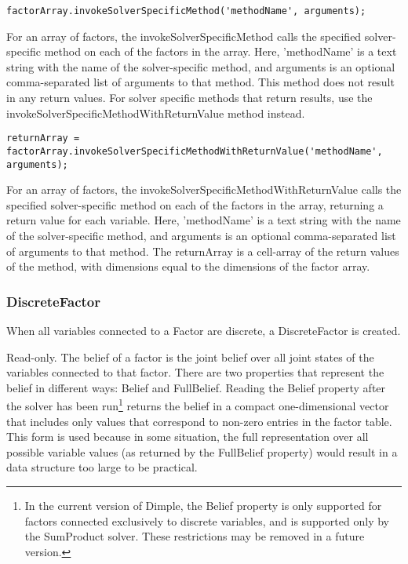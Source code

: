 
\begin{lstlisting}
factorArray.invokeSolverSpecificMethod('methodName', arguments);
\end{lstlisting}

For an array of factors, the invokeSolverSpecificMethod calls the specified solver-specific method on each of the factors in the array.  Here, 'methodName' is a text string with the name of the solver-specific method, and arguments is an optional comma-separated list of arguments to that method.  This method does not result in any return values.  For solver specific methods that return results, use the invokeSolverSpecificMethodWithReturnValue method instead.



\begin{lstlisting}
returnArray = factorArray.invokeSolverSpecificMethodWithReturnValue('methodName', arguments);
\end{lstlisting}

For an array of factors, the invokeSolverSpecificMethodWithReturnValue calls the specified solver-specific method on each of the factors in the array, returning a return value for each variable.  Here, 'methodName' is a text string with the name of the solver-specific method, and arguments is an optional comma-separated list of arguments to that method.  The returnArray is a cell-array of the return values of the method, with dimensions equal to the dimensions of the factor array.

\fi

\subsubsection{DiscreteFactor}

When all variables connected to a Factor are discrete, a DiscreteFactor is created.


\label{sec:Factor.Belief}

Read-only.  The belief of a factor is the joint belief over all joint states of the variables connected to that factor.  There are two properties that represent the belief in different ways: Belief and FullBelief.  Reading the Belief property after the solver has been run\footnote{In the current version of Dimple, the Belief property is only supported for factors connected exclusively to discrete variables, and is supported only by the SumProduct solver.  These restrictions may be removed in a future version.} returns the belief in a compact one-dimensional vector that includes only values that correspond to non-zero entries in the factor table.  This form is used because in some situation, the full representation over all possible variable values (as returned by the FullBelief property) would result in a data structure too large to be practical.

